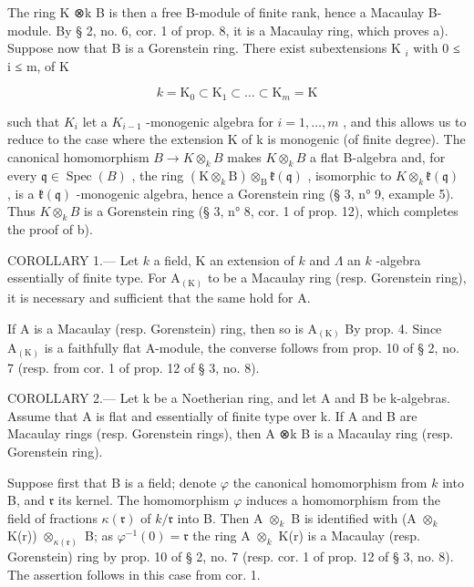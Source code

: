 The ring K ⊗k B is then a free B-module of finite rank, hence a Macaulay B-module. By § 2, no. 6, cor. 1 of prop. 8, it is a Macaulay ring, which proves a). Suppose now that B is a Gorenstein ring. There exist subextensions K \(_{i}\) with 0 ≤ i ≤ m, of K

\[
k = \mathrm{K} _ {0} \subset \mathrm{K} _ {1} \subset \dots \subset \mathrm{K} _ {m} = \mathrm{K}
\]

such that \(K_{i}\) let a \(K_{i-1}\) -monogenic algebra for \(i = 1, \ldots, m\) , and this allows us to reduce to the case where the extension K of k is monogenic (of finite degree). The canonical homomorphism \(B \to K \otimes_{k} B\) makes \(K \otimes_{k} B\) a flat B-algebra and, for every \(\mathfrak{q} \in \operatorname{Spec}(B)\) , the ring \((\mathrm{K} \otimes_{k} \mathrm{B}) \otimes_{\mathrm{B}} \mathfrak{k}(\mathfrak{q})\) , isomorphic to \(K \otimes_{k} \mathfrak{k}(\mathfrak{q})\) , is a \(\mathfrak{k}(\mathfrak{q})\) -monogenic algebra, hence a Gorenstein ring (§ 3, n° 9, example 5). Thus \(K \otimes_{k} B\) is a Gorenstein ring (§ 3, n° 8, cor. 1 of prop. 12), which completes the proof of b).

COROLLARY 1.--- Let \(k\) a field, K an extension of \(k\) and \(\Lambda\) an \(k\) -algebra essentially of finite type. For \(\mathrm{A}_{(\mathrm{K})}\) to be a Macaulay ring (resp. Gorenstein ring), it is necessary and sufficient that the same hold for A.

If A is a Macaulay (resp. Gorenstein) ring, then so is \(\mathrm{A}_{(\mathrm{K})}\) By prop. 4. Since \(\mathrm{A}_{(\mathrm{K})}\) is a faithfully flat A-module, the converse follows from prop. 10 of § 2, no. 7 (resp. from cor. 1 of prop. 12 of § 3, no. 8).

COROLLARY 2.--- Let k be a Noetherian ring, and let A and B be k-algebras. Assume that A is flat and essentially of finite type over k. If A and B are Macaulay rings (resp. Gorenstein rings), then A ⊗k B is a Macaulay ring (resp. Gorenstein ring).

Suppose first that B is a field; denote \(\varphi\) the canonical homomorphism from \(k\) into B, and \(\mathfrak{r}\) its kernel. The homomorphism \(\varphi\) induces a homomorphism from the field of fractions \(\kappa(\mathfrak{r})\) of \(k/\mathfrak{r}\) into B. Then A \(\otimes_{k}\) B is identified with (A \(\otimes_{k}\) K(r)) \(\otimes_{\kappa(\mathfrak{r})}\) B; as \(\varphi^{-1}(0)=\mathfrak{r}\) the ring A \(\otimes_{k}\) K(r) is a Macaulay (resp. Gorenstein) ring by prop. 10 of § 2, no. 7 (resp. cor. 1 of prop. 12 of § 3, no. 8). The assertion follows in this case from cor. 1.

